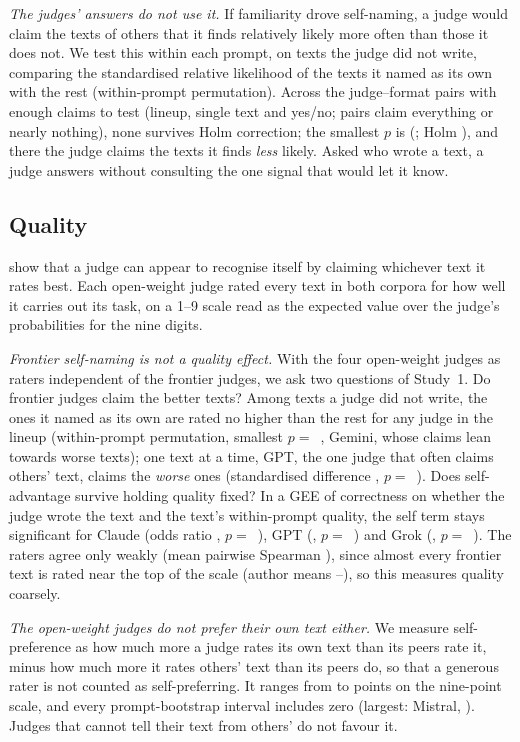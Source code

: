 \emph{The judges' answers do not use it.} If familiarity drove self-naming,
a judge would claim the texts of others that it finds relatively likely more
often than those it does not. We test this within each prompt, on texts the
judge did not write, comparing the standardised relative likelihood of the
texts it named as its own with the rest (within-prompt permutation). Across
the \OWFamTests{} judge--format pairs with enough claims to test (lineup,
single text and yes/no; \OWFamUntestable{} pairs claim everything or nearly
nothing), none survives Holm correction; the smallest $p$ is
\OWFamMinP{} (\OWFamMinWho{}; Holm \OWFamMinHolm{}), and there the judge
claims the texts it finds \emph{less} likely. Asked who wrote a text, a judge
answers without consulting the one signal that would let it know.

\subsection{Quality}
\label{sec:quality}
\citet{stamand2026sgtr} show that a judge can appear to recognise itself by
claiming whichever text it rates best. Each open-weight judge rated every
text in both corpora for how well it carries out its task, on a 1--9 scale
read as the expected value over the judge's probabilities for the nine
digits.

\emph{Frontier self-naming is not a quality effect.} With the four
open-weight judges as raters independent of the frontier judges, we ask two
questions of Study~1. Do frontier judges claim the better texts? Among texts
a judge did not write, the ones it named as its own are rated no higher than
the rest for any judge in the lineup (within-prompt permutation, smallest
$p=$~\QFLineupClaimMinP{}, Gemini, whose claims lean towards worse texts);
one text at a time, GPT, the one judge that often claims others' text,
claims the \emph{worse} ones (standardised difference \QFGPTSingleClaimDiff{},
$p=$~\QFGPTSingleClaimP{}). Does self-advantage survive holding quality
fixed? In a GEE of correctness on whether the judge wrote the text and the
text's within-prompt quality, the self term stays significant for Claude
(odds ratio \QFClaudeLineupOR{}, $p=$~\QFClaudeLineupORP{}), GPT
(\QFGPTLineupOR{}, $p=$~\QFGPTLineupORP{}) and Grok (\QFGrokLineupOR{},
$p=$~\QFGrokLineupORP{}). The raters agree only weakly (mean pairwise
Spearman \QFRaterRho{}), since almost every frontier text is rated near the
top of the scale (author means \QFMeanLo{}--\QFMeanHi{}), so this measures
quality coarsely.

\emph{The open-weight judges do not prefer their own text either.} We
measure self-preference as how much more a judge rates its own text than its
peers rate it, minus how much more it rates others' text than its peers do,
so that a generous rater is not counted as self-preferring. It ranges from
\OWQualSelfPrefMin{} to \OWQualSelfPrefMax{} points on the nine-point scale,
and every prompt-bootstrap interval includes zero (largest: Mistral,
\OWMistralQualSelfPref{} \OWMistralQualSelfPrefCI{}). Judges that cannot tell
their text from others' do not favour it.


